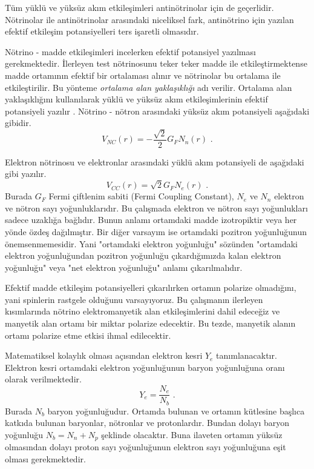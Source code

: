 Tüm yüklü ve yüksüz akım etkileşimleri antinötrinolar için de geçerlidir. Nötrinolar ile antinötrinolar arasındaki niceliksel fark, antinötrino için yazılan efektif etkileşim potansiyelleri ters işaretli olmasıdır.

Nötrino - madde etkileşimleri incelerken efektif potansiyel yazılması gerekmektedir. İlerleyen test nötrinosunu teker teker madde ile etkileştirmektense madde ortamının efektif bir ortalaması alınır ve nötrinolar bu ortalama ile etkileştirilir. Bu yönteme \emph{ortalama alan yaklaşıklığı} adı verilir. Ortalama alan yaklaşıklığını kullanılarak yüklü ve yüksüz akım etkileşimlerinin efektif potansiyeli yazılır \cite{Giunti:2007ry, Kuo:1989qe}. Nötrino - nötron arasındaki yüksüz akım potansiyeli aşağıdaki gibidir.
\begin{equation}\label{eqn:MaddeEtk_NCPot}
	V_{NC}(r) = -\frac{\sqrt{2}}{2} G_{F} N_{n}(r) \text{ .}
\end{equation}

Elektron nötrinosu ve elektronlar arasındaki yüklü akım potansiyeli de aşağıdaki gibi yazılır.
\begin{equation}\label{eqn:MaddeEtk_CCPot}
	V_{CC}(r) = \sqrt{2} G_{F} N_{e}(r) \text{ .}
\end{equation}
Burada $ G_{F} $ Fermi çiftlenim sabiti (Fermi Coupling Constant), $ N_{e} $ ve $ N_{n} $ elektron ve nötron sayı yoğunluklarıdır. Bu çalışmada elektron ve nötron sayı yoğunlukları sadece uzaklığa bağlıdır. Bunun anlamı ortamdaki madde izotropiktir veya her yönde özdeş dağılmıştır. Bir diğer varsayım ise ortamdaki pozitron yoğunluğunun önemsenmemesidir. Yani "ortamdaki elektron yoğunluğu" sözünden "ortamdaki elektron yoğunluğundan pozitron yoğunluğu çıkardığımızda kalan elektron yoğunluğu" veya "net elektron yoğunluğu" anlamı çıkarılmalıdır. 

Efektif madde etkileşim potansiyelleri çıkarılırken ortamın polarize olmadığını, yani spinlerin rastgele olduğunu varsayıyoruz. Bu çalışmanın ilerleyen kısımlarında nötrino elektromanyetik alan etkileşimlerini dahil edeceğiz ve manyetik alan ortamı bir miktar polarize edecektir. Bu tezde, manyetik alanın ortamı polarize etme etkisi ihmal edilecektir.

Matematiksel kolaylık olması açısından elektron kesri $ Y_{e} $ tanımlanacaktır. Elektron kesri ortamdaki elektron yoğunluğunun baryon yoğunluğuna oranı olarak verilmektedir.
\begin{equation}
	Y_{e} = \frac{N_{e}}{N_{b}} \text{ .}
\end{equation}
Burada $ N_{b} $ baryon yoğunluğudur. Ortamda bulunan ve ortamın kütlesine başlıca katkıda bulunan baryonlar, nötronlar ve protonlardır. Bundan dolayı baryon yoğunluğu $ N_{b} = N_{n} + N_{p} $ şeklinde olacaktır. Buna ilaveten ortamın yüksüz olmasından dolayı proton sayı yoğunluğunun elektron sayı yoğunluğuna eşit olması gerekmektedir. 

